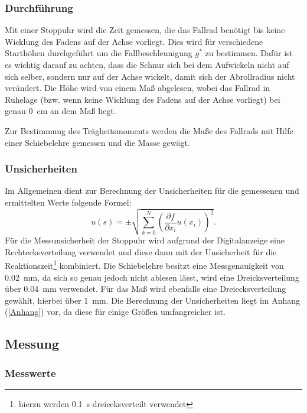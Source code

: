 \subsubsection{Durchführung}

Mit einer Stoppuhr wird die Zeit gemessen, die das Fallrad benötigt bis keine Wicklung des Fadens auf der Achse vorliegt. Dies wird für verschiedene Starthöhen durchgeführt um die Fallbeschleunigung $g^{*}$ zu bestimmen. Dafür ist es wichtig darauf zu achten, dass die Schnur sich bei dem Aufwickeln nicht auf sich selber, sondern nur auf der Achse wickelt, damit sich der Abrollradius nicht verändert.
Die Höhe wird von einem Maß abgelesen, wobei das Fallrad in Ruhelage (bzw. wenn keine Wicklung des Fadens auf der Achse vorliegt) bei genau \SI{0}{\cm} an dem Maß liegt. 

Zur Bestimmung des Trägheitsmoments werden die Maße des Fallrads mit Hilfe einer Schiebelehre gemessen und die Masse gewägt.			

\subsubsection{Unsicherheiten}

Im Allgemeinen dient zur Berechnung der Unsicherheiten für die gemessenen und ermittelten Werte folgende Formel: 
\begin{equation*}
u(s) = \pm \sqrt{\sum_{k=0}^{N}\left( \frac{\partial f}{\partial x_i}u(x_i)\right) ^2}. \label{eq:kombUnsicherheit}
\end{equation*}
Für die Messunsicherheit der Stoppuhr wird aufgrund der Digitalanzeige eine Rechtecksverteilung verwendet und diese dann mit der Unsicherheit für die Reaktionszeit\footnote{hierzu werden \SI{0.1}{\s} dreiecksverteilt verwendet} kombiniert. Die Schiebelehre besitzt eine Messgenauigkeit von \SI{0,02}{\mm}, da sich so genau jedoch nicht ablesen lässt, wird eine Dreicksverteilung über \SI{0,04}{\mm} verwendet. Für das Maß wird ebenfalls eine Dreiecksverteilung gewählt, hierbei über \SI{1}{\mm}.
Die Berechnung der Unsicherheiten liegt im Anhang (\ref{Anhang})  vor, da diese für einige Größen umfangreicher ist.

\subsection{Messung}

\subsubsection{Messwerte}


